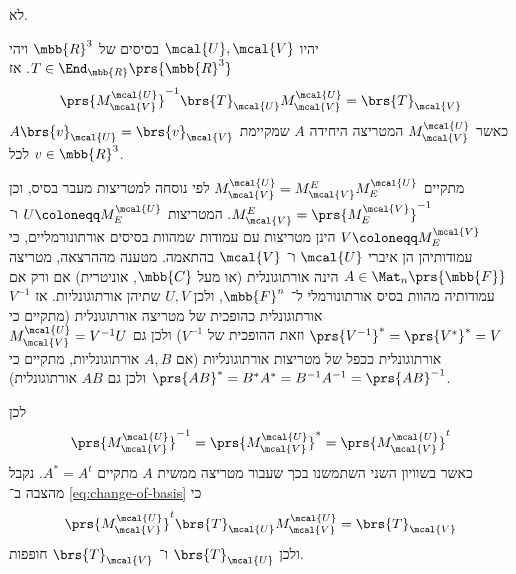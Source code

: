 \documentclass[a4paper,10pt,twoside,openany]{article}
\begin{document}
\begin{solution}
לא.

יהיו
$\mcal{U}, \mcal{V}$
בסיסים של
$\mbb{R}^3$
ויהי
$T \in \End_{\mbb{R}}\prs{\mbb{R}^3}$.
אז
\begin{align} \label{eq:change-of-basis}
\prs{M^{\mcal{U}}_{\mcal{V}}}^{-1} \brs{T}_{\mcal{U}} M^{\mcal{U}}_{\mcal{V}} = \brs{T}_{\mcal{V}}
\end{align}
כאשר
$M^{\mcal{U}}_{\mcal{V}}$
המטריצה היחידה
$A$
שמקיימת
$A \brs{v}_{\mcal{U}} = \brs{v}_{\mcal{V}}$
לכל
$v \in \mbb{R}^3$.

מתקיים
$M^{\mcal{U}}_{\mcal{V}} = M^{E}_{\mcal{V}} M^{\mcal{U}}_E$
לפי נוסחה למטריצות מעבר בסיס, וכן
$M^{E}_{\mcal{V}} = \prs{M^{\mcal{V}}_E}^{-1}$.
המטריצות
$U \coloneqq M^{\mcal{U}}_E$
ו־%
$V \coloneqq M^{\mcal{V}}_E$
הינן מטריצות עם עמודות שמהוות בסיסים אורתונורמליים, כי עמודותיהן הן איברי
$\mcal{U}$
ו־%
$\mcal{V}$
בהתאמה.
מטענה מההרצאה, מטריצה
$A \in \Mat_n\prs{\mbb{F}}$
הינה אורתוגונלית (או מעל $\mbb{C}$, אוניטרית) אם ורק אם עמודותיה מהוות בסיס אורתונורמלי ל־%
$\mbb{F}^n$,
ולכן
$U,V$
שתיהן אורתוגונליות.
אז
$V^{-1}$
אורתוגונלית כהופכית של מטריצה אורתוגונלית (מתקיים כי
$\prs{V^{-1}}^* = \prs{V^*}^* = V$
וזאת ההופכית של
$V^{-1}$)
ולכן גם
$M^{\mcal{U}}_{\mcal{V}} = V^{-1} U$
אורתוגונלית ככפל של מטריצות אורתוגונליות (אם
$A,B$
אורתוגונליות, מתקיים כי
$\prs{AB}^* = B^* A^* = B^{-1} A^{-1} = \prs{AB}^{-1}$
ולכן גם
$AB$
אורתוגונלית).

לכן
\[\prs{M^{\mcal{U}}_{\mcal{V}}}^{-1} = \prs{M^{\mcal{U}}_{\mcal{V}}}^* = \prs{M^{\mcal{U}}_{\mcal{V}}}^t\]
כאשר בשוויון השני השתמשנו בכך שעבור מטריצה ממשית
$A$
מתקיים
$A^* = A^t$.
נקבל מהצבה ב־%
\eqref{eq:change-of-basis}
כי
\begin{align*}
\prs{M^{\mcal{U}}_{\mcal{V}}}^{t} \brs{T}_{\mcal{U}} M^{\mcal{U}}_{\mcal{V}} = \brs{T}_{\mcal{V}}
\end{align*}
ולכן
$\brs{T}_{\mcal{U}}$
ו־%
$\brs{T}_{\mcal{V}}$
חופפות.
\end{solution}
\end{document}
